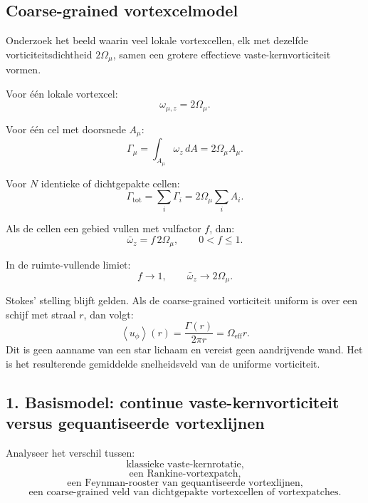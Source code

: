 \documentclass[11pt]{article}
\begin{document}
    
    \subsection{Coarse-grained vortexcelmodel}
        
        Onderzoek het beeld waarin veel lokale vortexcellen, elk met dezelfde vorticiteitsdichtheid \(2\Omega_{\mu}\), samen een grotere effectieve vaste-kernvorticiteit vormen.
        
        Voor één lokale vortexcel:
        \[
            \omega_{\mu,z}=2\Omega_{\mu}.
        \]
        
        Voor één cel met doorsnede \(A_{\mu}\):
        \[
            \Gamma_{\mu}
            =
            \int_{A_{\mu}}\omega_z\,dA
            =
            2\Omega_{\mu}A_{\mu}.
        \]
        
        Voor \(N\) identieke of dichtgepakte cellen:
        \[
            \Gamma_{\mathrm{tot}}
            =
            \sum_i\Gamma_i
            =
            2\Omega_{\mu}\sum_i A_i.
        \]
        
        Als de cellen een gebied vullen met vulfactor \(f\), dan:
        \[
            \bar{\omega}_z
            =
            f\,2\Omega_{\mu},
            \qquad
            0<f\leq1.
        \]
        
        In de ruimte-vullende limiet:
        \[
            f\rightarrow1,
            \qquad
            \bar{\omega}_z\rightarrow2\Omega_{\mu}.
        \]
        
        Stokes' stelling blijft gelden. Als de coarse-grained vorticiteit uniform is over een schijf met straal \(r\), dan volgt:
        \[
            \left\langle u_{\phi}\right\rangle(r)
            =
            \frac{\Gamma(r)}{2\pi r}
            =
            \Omega_{\mathrm{eff}}r.
        \]
        Dit is geen aanname van een star lichaam en vereist geen aandrijvende wand. Het is het resulterende gemiddelde snelheidsveld van de uniforme vorticiteit.
    
    \subsection{1. Basismodel: continue vaste-kernvorticiteit versus gequantiseerde vortexlijnen}
        
        Analyseer het verschil tussen:
        \[
            \text{klassieke vaste-kernrotatie,}
        \]
        \[
            \text{een Rankine-vortexpatch,}
        \]
        \[
            \text{een Feynman-rooster van gequantiseerde vortexlijnen,}
        \]
        \[
            \text{een coarse-grained veld van dichtgepakte vortexcellen of vortexpatches.}
        \]
        
\end{document}
